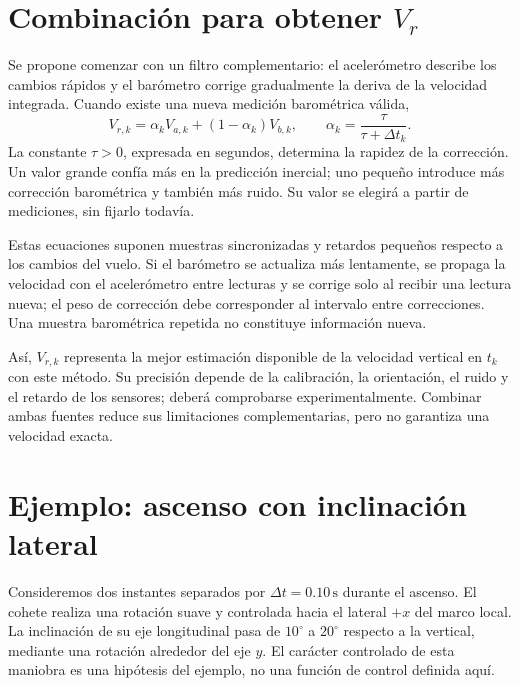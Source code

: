 \documentclass[11pt,a4paper]{article}
\begin{document}
\section{Combinación para obtener $V_r$}
Se propone comenzar con un filtro complementario: el acelerómetro describe los cambios rápidos y el barómetro corrige gradualmente la deriva de la velocidad integrada. Cuando existe una nueva medición barométrica válida,
\begin{equation}
 \boxed{V_{r,k}=\alpha_k V_{a,k}+(1-\alpha_k)V_{b,k}},
 \qquad \alpha_k=\frac{\tau}{\tau+\Delta t_k}.
\end{equation}
La constante $\tau>0$, expresada en segundos, determina la rapidez de la corrección. Un valor grande confía más en la predicción inercial; uno pequeño introduce más corrección barométrica y también más ruido. Su valor se elegirá a partir de mediciones, sin fijarlo todavía.

Estas ecuaciones suponen muestras sincronizadas y retardos pequeños respecto a los cambios del vuelo. Si el barómetro se actualiza más lentamente, se propaga la velocidad con el acelerómetro entre lecturas y se corrige solo al recibir una lectura nueva; el peso de corrección debe corresponder al intervalo entre correcciones. Una muestra barométrica repetida no constituye información nueva.

Así, $V_{r,k}$ representa la mejor estimación disponible de la velocidad vertical en $t_k$ con este método. Su precisión depende de la calibración, la orientación, el ruido y el retardo de los sensores; deberá comprobarse experimentalmente. Combinar ambas fuentes reduce sus limitaciones complementarias, pero no garantiza una velocidad exacta.
\newpage
\section{Ejemplo: ascenso con inclinación lateral}
Consideremos dos instantes separados por $\Delta t=0.10\,\mathrm{s}$ durante el ascenso. El cohete realiza una rotación suave y controlada hacia el lateral $+x$ del marco local. La inclinación de su eje longitudinal pasa de $10^\circ$ a $20^\circ$ respecto a la vertical, mediante una rotación alrededor del eje $y$. El carácter controlado de esta maniobra es una hipótesis del ejemplo, no una función de control definida aquí.
\end{document}
